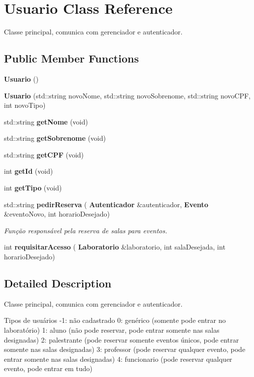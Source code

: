 \section{Usuario Class Reference}
\label{class_usuario}


Classe principal, comunica com gerenciador e autenticador.  


\subsection*{Public Member Functions}
\begin{DoxyCompactItemize}
\item 
\textbf{ Usuario} ()
\item 
\textbf{ Usuario} (std\+::string novo\+Nome, std\+::string novo\+Sobrenome, std\+::string novo\+C\+PF, int novo\+Tipo)
\item 
std\+::string \textbf{ get\+Nome} (void)
\item 
std\+::string \textbf{ get\+Sobrenome} (void)
\item 
std\+::string \textbf{ get\+C\+PF} (void)
\item 
int \textbf{ get\+Id} (void)
\item 
int \textbf{ get\+Tipo} (void)
\item 
std\+::string \textbf{ pedir\+Reserva} (\textbf{ Autenticador} \&autenticador, \textbf{ Evento} \&evento\+Novo, int horario\+Desejado)
\begin{DoxyCompactList}\small\item\em Função responsável pela reserva de salas para eventos. \end{DoxyCompactList}\item 
int \textbf{ requisitar\+Acesso} (\textbf{ Laboratorio} \&laboratorio, int sala\+Desejada, int horario\+Desejado)
\end{DoxyCompactItemize}


\subsection{Detailed Description}
Classe principal, comunica com gerenciador e autenticador. 

Tipos de usuários -\/1\+: não cadastrado 0\+: genérico (somente pode entrar no laboratório) 1\+: aluno (não pode reservar, pode entrar somente nas salas designadas) 2\+: palestrante (pode reservar somente eventos únicos, pode entrar somente nas salas designadas) 3\+: professor (pode reservar qualquer evento, pode entrar somente nas salas designadas) 4\+: funcionario (pode reservar qualquer evento, pode entrar em tudo)

